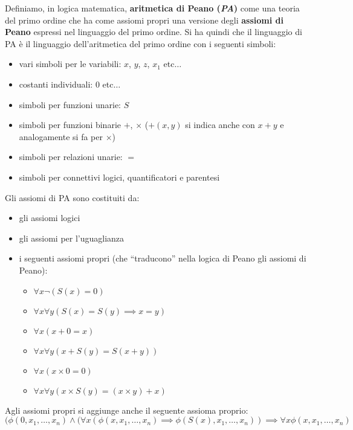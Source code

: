 \documentclass[a4paper,12pt, oneside]{book}
\begin{document}
\begin{shaded}
\begin{definizione}
  \end{definizione}
  \begin{definizione}
    Definiamo, in logica matematica, \textbf{aritmetica di Peano (\textit{PA})}
    come una teoria del primo 
    ordine che ha come assiomi propri una versione degli \textbf{assiomi di
      Peano} 
    espressi nel linguaggio del primo ordine. Si ha quindi che il linguaggio di
    PA 
    è il linguaggio dell'aritmetica del primo ordine con i seguenti simboli:
    \begin{itemize}
      \item vari simboli per le variabili: $x$, $y$, $z$, $x_1$ etc$\ldots$
      \item costanti individuali: $0$ etc$\ldots$
      \item simboli per funzioni unarie: $S$
      \item simboli per funzioni binarie $+$, $\times$ ($+(x,y)$ si indica anche
      con $x+y$ e analogamente si fa per $\times$)
      \item simboli per relazioni unarie: $=$
      \item simboli per connettivi logici, quantificatori e parentesi
    \end{itemize}
    Gli assiomi di PA sono costituiti da:
    \begin{itemize}
      \item gli assiomi logici
      \item gli assiomi per l'uguaglianza
      \item i seguenti assiomi propri (che ``traducono'' nella logica di Peano
      gli assiomi di Peano):
      \begin{itemize}
        \item $\forall x\neg(S(x)=0)$
        \item $\forall x\forall y(S(x)=S(y)\implies x=y)$
        \item $\forall x(x+0=x)$
        \item $\forall x\forall y(x+S(y)=S(x+y))$
        \item $\forall x(x\times 0 =0)$
        \item $\forall x\forall y(x\times S(y)=(x\times y)+x)$
      \end{itemize}
    \end{itemize}
    Agli assiomi propri si aggiunge anche il seguente assioma proprio:
    {\footnotesize{\[(\phi(0,x_1,\ldots,x_n)\land(\forall
      x(\phi(x,x_1,\ldots,x_n)\implies\phi(S(x),x_1,\ldots,x_n))\implies\forall 
      x\phi(x,x_1,\ldots,x_n)\]}}

\end{definizione}
\end{shaded}
\end{document}
